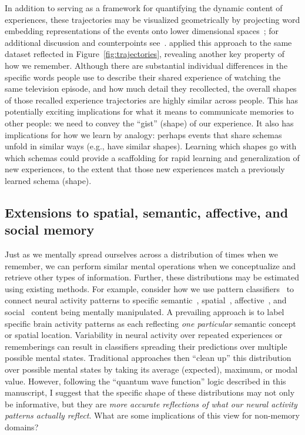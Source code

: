 \documentclass{article}
\begin{document}
In addition to serving as a framework for quantifying the dynamic content of experiences, these trajectories may be visualized geometrically by projecting word embedding representations of the events onto lower dimensional spaces~\citep[e.g., ][]{HeusEtal18a}; for additional discussion and counterpoints see~\cite{JollChan18}.  \cite{HeusEtal18c} applied this approach to the same dataset reflected in Figure~\ref{fig:trajectories}, revealing another key property of how we remember.  Although there are substantial individual differences in the specific words people use to describe their shared experience of watching the same television episode, and how much detail they recollected, the overall shapes of those recalled experience trajectories are highly similar across people.  This has potentially exciting implications for what it means to communicate memories to other people: we need to convey the ``gist'' (shape) of our experience.  It also has implications for how we learn by analogy: perhaps events that share schemas~\citep[e.g., ][]{BaldEtal18}  unfold in similar ways (e.g., have similar shapes).  Learning which shapes go with which schemas could provide a scaffolding for rapid learning and generalization of new experiences, to the extent that those new experiences match a previously learned schema (shape).


\subsection*{Extensions to spatial, semantic, affective, and social memory}
Just as we mentally spread ourselves across a distribution of times when we remember, we can perform similar mental operations when we conceptualize and retrieve other types of information.  Further, these distributions may be estimated using existing methods.  For example, consider how we use pattern classifiers~\citep{NormEtal06b} to connect neural activity patterns to specific semantic~\citep{PolyEtal05, MitcEtal08, MannEtal12}, spatial~\citep{MillEtal13}, affective~\citep{ChanEtal18}, and social~\citep{MeyeEtal18} content being mentally manipulated.
A prevailing approach is to label specific brain activity patterns as each reflecting \textit{one particular} semantic concept or spatial location.  Variability in neural activity over repeated experiences or rememberings can result in classifiers spreading their predictions over multiple possible mental states.  Traditional approaches then ``clean up'' this distribution over possible mental states by taking its average (expected), maximum, or modal value.  However, following the ``quantum wave function'' logic described in this manuscript, I suggest that the specific shape of these distributions may not only be informative, but they are \textit{more accurate reflections of what our neural activity patterns actually reflect}.  What are some implications of this view for non-memory domains?
\end{document}
